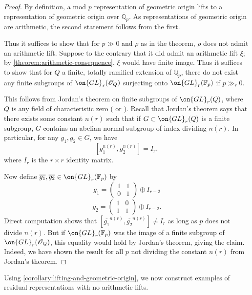 \documentclass[12 pt]{amsart}
\theoremstyle{plain}
\theoremstyle{definition}
\theoremstyle{remark}
\numberwithin{equation}{section}
\begin{document}
\begin{proof}
	By definition, a mod $p$ representation of geometric origin lifts to a
representation of geometric origin over $\overline{\mathbb{Q}}_p$. As representations of geometric origin are arithmetic, the second statement follows from the first.
	
	Thus it suffices to show that for $p\gg 0$ and $\rho$ as in the theorem, $\rho$ does not admit an arithmetic lift. Suppose to the contrary that it did admit an arithmetic lift $\xi$; by \autoref{theorem:arithmetic-consequence}, $\xi$ would have finite image. Thus it suffices to show that for $Q$ a finite, totally ramified extension of $\mathbb{Q}_p$, there do not exist any finite subgroups of $\on{GL}_r(\mathscr{O}_Q)$ surjecting onto $\on{GL}_r(\mathbb{F}_p)$ if $p\gg_r 0$. 
	
	This follows from Jordan's theorem on finite subgroups of $\on{GL}_r(Q)$,
	where $Q$ is any field of characteristic zero
	(\cite[p.~91]{jordan1878memoire} or \cite[Theorem
	36.13]{curtis1966representation}). Recall that Jordan's theorem says
	that there exists some constant $n(r)$ such that if $G\subset \on{GL}_r(Q)$ is a finite subgroup, $G$ contains an abelian normal subgroup of index dividing $n(r)$. In particular, for any $g_1, g_2\in G$, we have $$[g_1^{n(r)}, g_2^{n(r)}]=I_r,$$ where $I_r$ is the $r\times r$  identity matrix.
	
	Now define $\overline{g_1}, \overline{g_2}\in \on{GL}_r(\mathbb{F}_p)$ by
	$$\overline{g_1}=\begin{pmatrix} 1 & 1 \\ 0 & 1 \end{pmatrix} \oplus
	I_{r-2}$$ $$\overline{g_2}=\begin{pmatrix} 1 & 0 \\ 1 & 1 \end{pmatrix}
	\oplus I_{r-2}.$$ Direct computation shows that $[\overline{g_1}^{n(r)},
	\overline{g_2}^{n(r)}]\neq I_r$ as long as $p$ does not divide $n(r)$.
	But if $\on{GL}_r(\mathbb{F}_p)$ was the image of a finite subgroup of
	$\on{GL}_r(\mathscr{O}_Q)$, this equality would hold by Jordan's theorem, giving the claim. Indeed, we have shown the result for all $p$ not dividing the constant $n(r)$ from Jordan's theorem.
\end{proof}
Using \autoref{corollary:lifting-and-geometric-origin}, we now construct
examples of residual representations with no arithmetic lifts.
\end{document}
